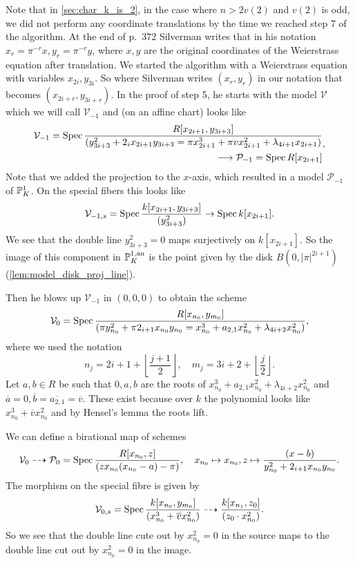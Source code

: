 Note that in \cref{sec:char_k_is_2}, in the case where $n > 2v(2)$ and $v(2)$ is odd, we did not perform any coordinate translations by the time we reached step 7 of the algorithm. 
At the end of p.\ 372 Silverman writes that in his notation $x_{r} = \pi^{-r}x, y_{r} = \pi^{-r}y$, where $x, y$ are the original coordinates of the Weierstrass equation after translation.
We started the algorithm with a Weierstrass equation with variables $x_{2i}, y_{3i}$. 
So where Silverman writes $(x_r, y_r)$ in our notation that becomes $(x_{2i+ r}, y_{3i + r})$. 
In the proof of step 5, he starts with the model $\mathcal{V} $ which we will call $\mathcal{V} _{-1}$ and (on an affine chart) looks like 
\[
	\begin{aligned}	
	\mathcal{V}_{-1} = \operatorname{Spec} \frac{R[x_{2i + 1}, y_{3i + 3}]}{(y_{3i + 3}^2 + 2_i x_{2i + 1}y_{3i + 3} = \pi x_{2i + 1}^3 + \pi v x_{2i + 1}^2 + \lambda_{4i + 1} x_{2i + 1})} \\ 
	\longrightarrow \mathcal{P} _{-1} = \operatorname{Spec} R[x_{2i + 1}]
	\end{aligned}
,\] 
Note that we added the projection to the $x$-axis, which resulted in a model $\mathcal P_{-1}$ of $\mathbb{P}^{1}_K$.  
On the special fibers this looks like 
\[
	\mathcal{V}_{-1,s} = \operatorname{Spec} \frac{k[x_{2i + 1}, y_{3i + 3}]}{(y_{3i+3}^2)} \to \operatorname{Spec} k[x_{2i + 1}]
.\] 
We see that the double line $y_{3i + 3}^2 = 0$ maps surjectively on $k[x _{2i + 1}]$. 
So the image of this component in $\mathbb{P}^{1, \text{an}}_K$ is the point given by the disk $B(0, |\pi|^{2i + 1})$ (\cref{lem:model_disk_proj_line}).


Then he blows up $\mathcal{V}_{-1} $ in $(0, 0, 0)$ to obtain the scheme
\[
	\mathcal{V}_0  = \operatorname{Spec} \frac{R[x_{n_0}, y_{m_0}]}{(\pi y_{n_0} ^2 + \pi2_{i + 1} x_{n_0} y_{n_0} = x_{n_0}^3 +  a_{2,1} x_{n_0}^2 + \lambda_{4i + 2} x_{n_0}^2)} 
,\] 
where we used the notation \[
	n_j = 2i + 1 + \left\lfloor \frac{j + 1}{2} \right\rfloor,\quad  m_j = 3i + 2 + \left\lfloor \frac{j }{2} \right\rfloor
.\]
Let $a, b \in R$ be such that $0, a, b$ are the roots of $x_{n_0}^3 +  a_{2,1} x_{n_0}^2 + \lambda_{4i + 2} x_{n_0}^2$ and $\overline{a} = 0, \overline{b} = \overline{a_{2,1}} = \overline{v}$.  
These exist because over $k$ the polynomial looks like $x_{n_0}^3 + \overline{v} x_{n_0}^2$ and by Hensel's lemma the roots lift. 

We can define a birational map of schemes \[
	\mathcal{V}_0 \dashrightarrow \mathcal{P} _{0} = \operatorname{Spec} \frac{R[x_{n_0}, z]}{(z x_{n_0}(x_{n_0} - a) - \pi)},\quad
	x_{n_0} \mapsto x_{n_0}, z\mapsto \frac{(x - b)}{y_{n_0}^2 + 2_{i + 1} x_{n_0}y_{n_0} }
.\] 
The morphism on the special fibre is given by \[
	\mathcal{V} _{0, s} = \operatorname{Spec} \frac{k[x_{n_0}, y_{m_0}]}{(x^3_{n_0} + \overline{v} x^2_{n_0})} \dashrightarrow \frac{k[x_{n_1}, z_0]}{(z_0 \cdot x_{n_0}^2)}
.\] 
So we see that the double line cute out by $x_{n_0}^2 = 0$ in the source maps to the double line cut out by $x_{n_0}^2 = 0$ in the image. 

